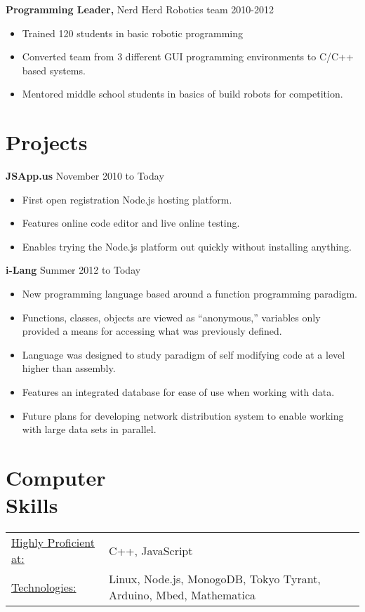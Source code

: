 \documentclass[margin]{res}
\begin{document}
\begin{resume}
{\bf Programming Leader,} Nerd Herd Robotics team \hfill 2010-2012
\begin{itemize} \itemsep -2pt
  \item Trained 120 students in basic robotic programming
  \item Converted team from 3 different GUI programming environments to C/C++ based systems. %
  \item Mentored middle school students in basics of build robots for competition.
\end{itemize}


\section{Projects}
{\bf JSApp.us} \hfill November 2010 to Today
\begin{itemize} \itemsep -2pt
  \item First open registration Node.js hosting platform.
  \item Features online code editor and live online testing.
  \item Enables trying the Node.js platform out quickly without installing anything.
\end{itemize}

{\bf i-Lang} \hfill Summer 2012 to Today
\begin{itemize} \itemsep -2pt
  \item New programming language based around a function programming paradigm.
  \item Functions, classes, objects are viewed as ``anonymous,'' variables only provided a means for accessing what was previously defined.
  \item Language was designed to study paradigm of self modifying code at a level higher than assembly.
  \item Features an integrated database for ease of use when working with data.
  \item Future plans for developing network distribution system to enable working with large data sets in parallel.
\end{itemize}

\section{Computer \\ Skills}
   \begin{tabular}{l p{3in}}
    \underline{Highly Proficient at:} & C++, JavaScript \\

     \underline{Technologies:} & Linux, Node.js, MonogoDB, Tokyo Tyrant, Arduino, Mbed, Mathematica
 \end{tabular}

\end{resume}
\end{document}
